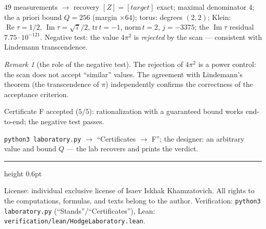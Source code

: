 \documentclass[11pt,a4paper]{article}
\theoremstyle{plain}
\theoremstyle{definition}
\theoremstyle{remark}
\newtheorem{remark}[theorem]{Remark}
\newcommand{\im}{\operatorname{Im}}
\newcommand{\re}{\operatorname{Re}}
\begin{document}
\begin{databox}
$49$ measurements $\to$ recovery $[Z]=[target]$ exact; maximal
denominator $4$; the a priori bound $Q=256$ (margin $\times64$);
torus: degrees $(2,2)$; Klein: $\re\tau=1/2$, $\im\tau=\sqrt7/2$,
$\mathrm{tr}\,t=-1$, $\mathrm{norm}\,t=2$, $j=-3375$; the
$\im\tau$ residual $7.75\cdot10^{-121}$. Negative test: the value
$4\pi^2$ is \emph{rejected} by the scan --- consistent with
Lindemann transcendence.
\end{databox}

\begin{remark}[the role of the negative test]
The rejection of $4\pi^2$ is a power control: the scan does not
accept ``similar'' values. The agreement with Lindemann's theorem
(the transcendence of $\pi$) independently confirms the correctness
of the acceptance criterion.
\end{remark}

\begin{statusbox}[summary]
Certificate F accepted ($5/5$): rationalization with a guaranteed
bound works end-to-end; the negative test passes.
\end{statusbox}

\begin{verifybox}[reproduction]
\texttt{python3 laboratory.py} $\to$ ``Certificates $\to$ F''; the
designer: an arbitrary value and bound $Q$ --- the lab recovers and
prints the verdict.
\end{verifybox}

\vfill
{\color{linkblue}\hrule height 0.6pt}
\vspace{0.5em}
{\small\color{gray}
License: individual exclusive license of Isaev Iskhak Khamzatovich.
All rights to the computations, formulas, and texts belong to the author.
Verification: \texttt{python3 laboratory.py} (``Stands''/``Certificates''),
Lean: \texttt{verification/lean/HodgeLaboratory.lean}.
}
\end{document}
